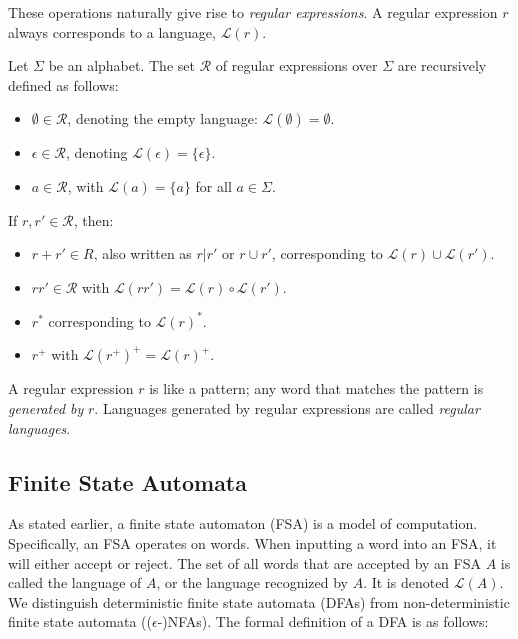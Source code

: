 These operations naturally give rise to \emph{regular expressions}. A regular expression $r$ always corresponds to a language, $\mathcal{L}(r)$. 

\begin{definition}
	Let $\Sigma$ be an alphabet. The set $\mathcal{R}$ of regular expressions over $\Sigma$ are recursively defined as follows:
	
	\begin{itemize}
		\item $\emptyset \in\mathcal{R}$, denoting the empty language: $\mathcal{L}(\emptyset)=\emptyset$.
		\item $\epsilon\in\mathcal{R}$, denoting $\mathcal{L}(\epsilon) = \{\epsilon\}$.
		\item $a\in\mathcal{R}$, with $\mathcal{L}(a)= \{a\}$ for all $a\in\Sigma$.
	\end{itemize}
	If $r,r' \in \mathcal{R}$, then:
	\begin{itemize}
		\item $r+r'\in R$, also written as $r|r'$ or $r\cup r'$, corresponding to $\mathcal{L}(r)\cup\mathcal{L}(r')$.
		\item $rr' \in\mathcal{R}$ with $\mathcal{L}(rr')= \mathcal{L}(r)\circ\mathcal{L}(r')$.
		\item $r^*$ corresponding to $\mathcal{L}(r)^*$.
		\item $r^+$ with $\mathcal{L}(r^+)^+= \mathcal{L}(r)^+$.
	\end{itemize}
\end{definition}

A regular expression $r$ is like a pattern; any word that matches the pattern is \emph{generated by} $r$. Languages generated by regular expressions are called \emph{regular languages}.

\subsection{Finite State Automata} 
As stated earlier, a finite state automaton (FSA) is a model of computation. Specifically, an FSA operates on words. When inputting a word into an FSA, it will either accept or reject. The set of all words that are accepted by an FSA $A$ is called the language of $A$, or the language recognized by $A$. It is denoted $\mathcal{L}(A)$. We distinguish deterministic finite state automata (DFAs) from non-deterministic finite state automata (($\epsilon$-)NFAs). The formal definition of a DFA is as follows:

